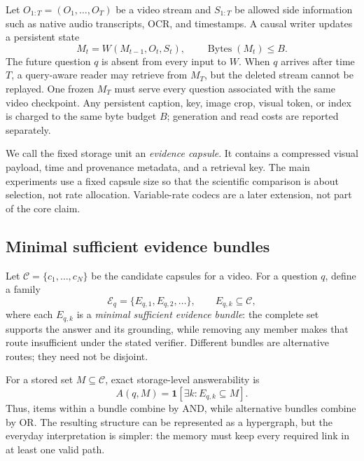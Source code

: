 \documentclass[10pt,twocolumn,letterpaper]{article}
\newcommand{\bytes}{\operatorname{Bytes}}
\begin{document}
Let $O_{1:T}=(O_1,\ldots,O_T)$ be a video stream and $S_{1:T}$ be allowed side information such as native audio transcripts, OCR, and timestamps.
A causal writer updates a persistent state
\begin{equation}
    M_t=W(M_{t-1},O_t,S_t), \qquad \bytes(M_t)\le B.
    \label{eq:writer}
\end{equation}
The future question $q$ is absent from every input to $W$.
When $q$ arrives after time $T$, a query-aware reader may retrieve from $M_T$, but the deleted stream cannot be replayed.
One frozen $M_T$ must serve every question associated with the same video checkpoint.
Any persistent caption, key, image crop, visual token, or index is charged to the same byte budget $B$; generation and read costs are reported separately.

We call the fixed storage unit an \emph{evidence capsule}.
It contains a compressed visual payload, time and provenance metadata, and a retrieval key.
The main experiments use a fixed capsule size so that the scientific comparison is about selection, not rate allocation.
Variable-rate codecs are a later extension, not part of the core claim.

\subsection{Minimal sufficient evidence bundles}

Let $\mathcal C=\{c_1,\ldots,c_N\}$ be the candidate capsules for a video.
For a question $q$, define a family
\begin{equation}
    \mathcal E_q=\{E_{q,1},E_{q,2},\ldots\}, \qquad E_{q,k}\subseteq\mathcal C,
    \label{eq:bundlefamily}
\end{equation}
where each $E_{q,k}$ is a \emph{minimal sufficient evidence bundle}: the complete set supports the answer and its grounding, while removing any member makes that route insufficient under the stated verifier.
Different bundles are alternative routes; they need not be disjoint.

For a stored set $M\subseteq\mathcal C$, exact storage-level answerability is
\begin{equation}
    A(q,M)=\mathbf{1}\!\left[\exists k: E_{q,k}\subseteq M\right].
    \label{eq:answerability}
\end{equation}
Thus, items within a bundle combine by AND, while alternative bundles combine by OR.
The resulting structure can be represented as a hypergraph, but the everyday interpretation is simpler: the memory must keep every required link in at least one valid path.
\end{document}

